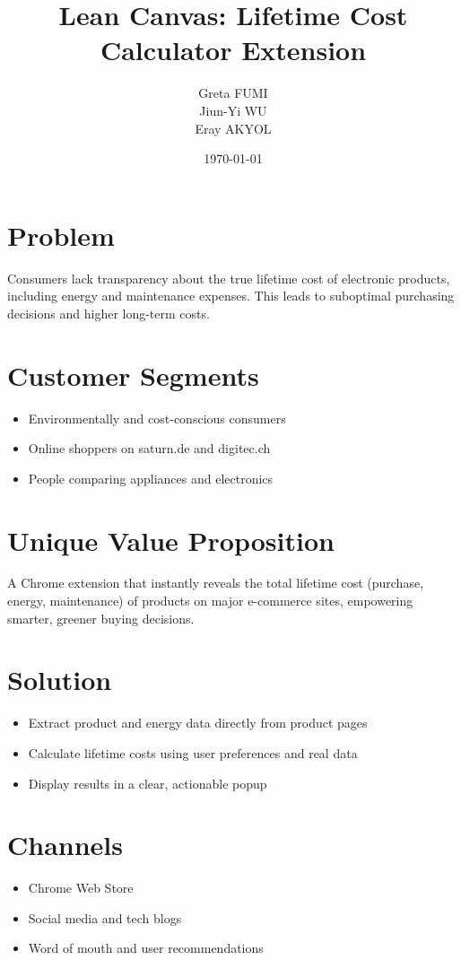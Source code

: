 \documentclass{article}
\title{Lean Canvas: Lifetime Cost Calculator Extension}
\author{Greta FUMI \\ Jiun-Yi WU \\ Eray AKYOL}
\date{\today}
\begin{document}
\maketitle

\section*{Problem}
Consumers lack transparency about the true lifetime cost of electronic products, including energy and maintenance expenses. This leads to suboptimal purchasing decisions and higher long-term costs.

\section*{Customer Segments}
\begin{itemize}
  \item Environmentally and cost-conscious consumers
  \item Online shoppers on saturn.de and digitec.ch
  \item People comparing appliances and electronics
\end{itemize}

\section*{Unique Value Proposition}
A Chrome extension that instantly reveals the total lifetime cost (purchase, energy, maintenance) of products on major e-commerce sites, empowering smarter, greener buying decisions.

\section*{Solution}
\begin{itemize}
  \item Extract product and energy data directly from product pages
  \item Calculate lifetime costs using user preferences and real data
  \item Display results in a clear, actionable popup
\end{itemize}

\section*{Channels}
\begin{itemize}
  \item Chrome Web Store
  \item Social media and tech blogs
  \item Word of mouth and user recommendations
\end{itemize}
\end{document}
